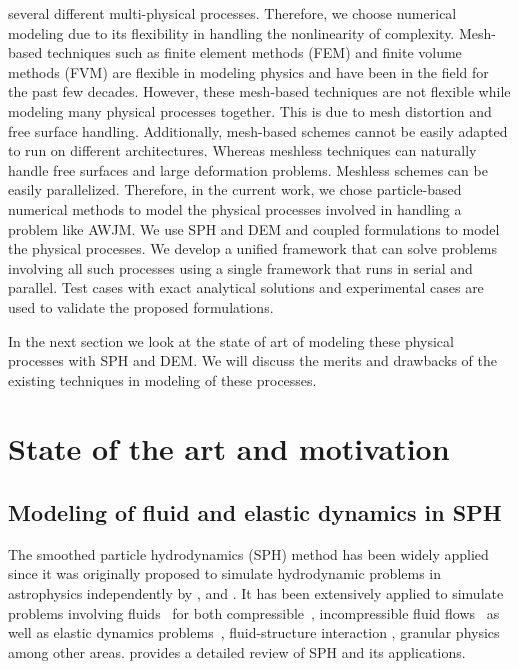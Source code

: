 several different multi-physical processes. Therefore, we choose numerical
modeling due to its flexibility in handling the nonlinearity of complexity.
Mesh-based techniques such as finite element methods (FEM) and finite volume
methods (FVM) are flexible in modeling physics and have been in the field for
the past few decades. However, these mesh-based techniques are not flexible
while modeling many physical processes together. This is due to mesh distortion
and free surface handling. Additionally, mesh-based schemes cannot be easily
adapted to run on different architectures. Whereas meshless techniques can
naturally handle free surfaces and large deformation problems. Meshless schemes
can be easily parallelized. Therefore, in the current work, we chose
particle-based numerical methods to model the physical processes involved in
handling a problem like AWJM. We use SPH and DEM and coupled formulations to
model the physical processes. We develop a unified framework that can solve
problems involving all such processes using a single framework that runs in
serial and parallel. Test cases with exact analytical solutions and experimental
cases are used to validate the proposed formulations.



In the next section we look at the state of art of modeling these physical
processes with SPH and DEM. We will discuss the merits and drawbacks of the
existing techniques in modeling of these processes.

\section{State of the art and motivation}
\subsection{Modeling of fluid and elastic dynamics in SPH}
The smoothed particle hydrodynamics (SPH) method has been widely applied since
it was originally proposed to simulate hydrodynamic problems in astrophysics
independently by \citet{lucy77}, and \citet{monaghan-gingold-stars-mnras-77}. It
has been extensively applied to simulate problems involving
fluids~\citep{dalrymple2001sph,shao2003incompressible} for both
compressible~\citep{monaghan-review:2005}, incompressible fluid
flows~\citep{sph:fsf:monaghan-jcp94,sph:psph:cummins-rudman:jcp:1999} as well as
elastic dynamics problems~\citep{randles-1996,gray-ed-2001}, fluid-structure
interaction \citep{khayyer2018enhanced,he2017coupled}, granular physics
\citep{bui2008lagrangian,bui2021smoothed} among other areas.
\cite{monaghan2012smoothed} provides a detailed review of SPH and its
applications.

